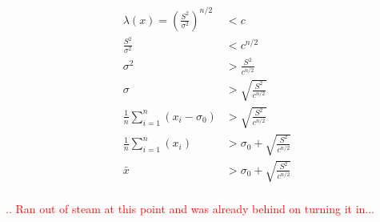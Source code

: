 \documentclass[12pt,letterpaper]{exam}
\begin{document}
\begin{questions}
\begin{solution}
\begin{parts}
			\begin{align*}
				\lambda(x) = \left( \frac{S^2}{\sigma^2} \right)^{n/2} &< c \\
				\frac{S^2}{\sigma^2} &< c^{n/2} \\
				\sigma^2 &> \frac{S^2}{c^{n/2}} \\
				\sigma &> \sqrt{\frac{S^2}{c^{n/2}} } \\
				\frac{1}{n}\sum_{i=1}^n (x_i - \sigma_0) &> \sqrt{\frac{S^2}{c^{n/2}} } \\
				\frac{1}{n}\sum_{i=1}^n (x_i) &> \sigma_0 + \sqrt{\frac{S^2}{c^{n/2}} } \\
				\bar{x} &> \sigma_0 + \sqrt{\frac{S^2}{c^{n/2}} } \\
			\end{align*}
			
			
			\textcolor{red}{.. Ran out of steam at this point and was already behind on turning it in...}
		\end{parts}
	\end{solution}

\end{questions}
\end{document}
